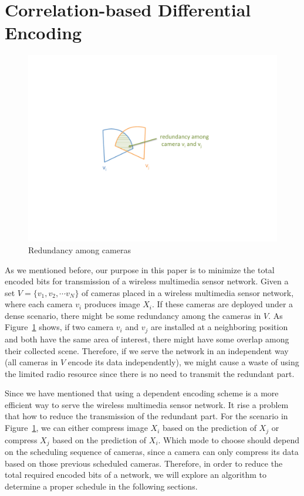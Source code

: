 
\section{Correlation-based Differential Encoding}
\label{sec::DifferentialEncoding}

\begin{figure}
\begin{center}
\includegraphics[width=0.7 \columnwidth]{./fig/cameraRedundancy.pdf}
\caption{\label{fig::cameraRedundancy}Redundancy among cameras}
\end{center}
\end{figure}
As we mentioned before, our purpose in this paper is to minimize the total
encoded bits for transmission of a wireless multimedia sensor network.
Given a set ${V=\{v_1,v_2, \cdots v_N \}}$ of cameras placed in a wireless
multimedia sensor network, where each camera $v_i$ produces image $X_i$.
If these cameras are deployed under a dense scenario, there might be some
redundancy among the cameras in $V$.
As Figure~\ref{fig::cameraRedundancy} shows, if two camera $v_i$ and $v_j$ are
installed at a neighboring position and both have the same area of interest,
there might have some overlap among their collected scene.
Therefore, if we serve the network in an independent way (all cameras in $V$
encode its data independently), we might cause a waste of using the limited
radio resource since there is no need to transmit the redundant part.

Since we have mentioned that using a dependent encoding scheme is a more
efficient way to serve the wireless multimedia sensor network.
It rise a problem that how to reduce the transmission of the redundant part.
For the scenario in Figure~\ref{fig::cameraRedundancy}, we can either
compress image $X_i$ based on the prediction of $X_j$ or compress $X_j$ based
on the prediction of $X_i$.
Which mode to choose should depend on the scheduling sequence of cameras, since
a camera can only compress its data based on those previous scheduled cameras.
Therefore, in order to reduce the total required encoded bits of a network, we
will explore an algorithm to determine a proper schedule in the following
sections. 